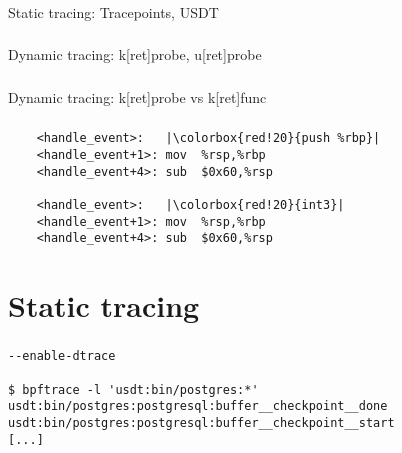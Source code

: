 \documentclass[usenames,dvipsnames, 18pt, compress, aspectratio=169]{beamer}
\begin{document}
\begin{frame}[fragile]{}
    \frametitle{}
    \begin{center}
        Static tracing: Tracepoints, USDT
    \end{center}
\end{frame}

\begin{frame}[fragile]{}
    \frametitle{}
    \begin{center}
        Dynamic tracing: k[ret]probe, u[ret]probe
    \end{center}
\end{frame}

\begin{frame}[fragile]{}
    \frametitle{}
    \begin{center}
        Dynamic tracing: k[ret]probe vs k[ret]func
    \end{center}
\end{frame}

\begin{frame}[fragile]{}
    \frametitle{}
    \begin{center}
        \begin{verbatim}
    <handle_event>:   |\colorbox{red!20}{push %rbp}|
    <handle_event+1>: mov  %rsp,%rbp
    <handle_event+4>: sub  $0x60,%rsp

    <handle_event>:   |\colorbox{red!20}{int3}|
    <handle_event+1>: mov  %rsp,%rbp
    <handle_event+4>: sub  $0x60,%rsp
        \end{verbatim}

    \end{center}
\end{frame}

\section{Static tracing}

\begin{frame}[fragile]{}
    \frametitle{}
    \begin{center}
        \begin{verbatim}
--enable-dtrace

$ bpftrace -l 'usdt:bin/postgres:*'
usdt:bin/postgres:postgresql:buffer__checkpoint__done
usdt:bin/postgres:postgresql:buffer__checkpoint__start
[...]
        \end{verbatim}
    \end{center}
\end{frame}
\end{document}
